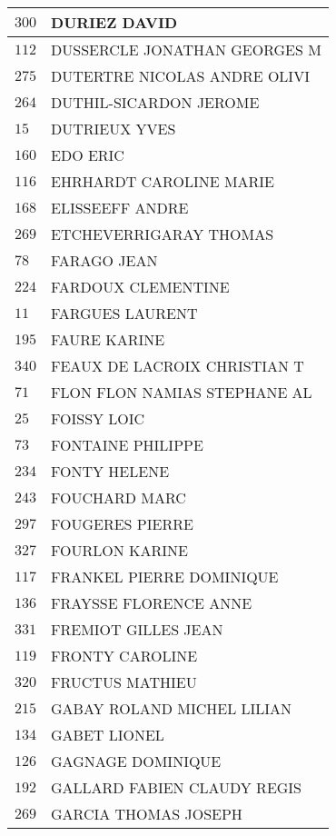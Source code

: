 \begin{xltabular}{\linewidth}{|l|X|}
    \hline
    $300$ & DURIEZ DAVID \\
    \hline
    $112$ & DUSSERCLE JONATHAN GEORGES M \\
    \hline
    $275$ & DUTERTRE NICOLAS ANDRE OLIVI \\
    \hline
    $264$ & DUTHIL-SICARDON JEROME \\
    \hline
    $15$ & DUTRIEUX YVES \\
    \hline
    $160$ & EDO ERIC \\
    \hline
    $116$ & EHRHARDT CAROLINE MARIE \\
    \hline
    $168$ & ELISSEEFF ANDRE \\
    \hline
    $269$ & ETCHEVERRIGARAY THOMAS \\
    \hline
    $78$ & FARAGO JEAN \\
    \hline
    $224$ & FARDOUX CLEMENTINE \\
    \hline
    $11$ & FARGUES LAURENT \\
    \hline
    $195$ & FAURE KARINE \\
    \hline
    $340$ & FEAUX DE LACROIX CHRISTIAN T \\
    \hline
    $71$ & FLON FLON NAMIAS STEPHANE AL \\
    \hline
    $25$ & FOISSY LOIC \\
    \hline
    $73$ & FONTAINE PHILIPPE \\
    \hline
    $234$ & FONTY HELENE \\
    \hline
    $243$ & FOUCHARD MARC \\
    \hline
    $297$ & FOUGERES PIERRE \\
    \hline
    $327$ & FOURLON KARINE \\
    \hline
    $117$ & FRANKEL PIERRE DOMINIQUE \\
    \hline
    $136$ & FRAYSSE FLORENCE ANNE \\
    \hline
    $331$ & FREMIOT GILLES JEAN \\
    \hline
    $119$ & FRONTY CAROLINE \\
    \hline
    $320$ & FRUCTUS MATHIEU \\
    \hline
    $215$ & GABAY ROLAND MICHEL LILIAN \\
    \hline
    $134$ & GABET LIONEL \\
    \hline
    $126$ & GAGNAGE DOMINIQUE \\
    \hline
    $192$ & GALLARD FABIEN CLAUDY REGIS \\
    \hline
    $269$ & GARCIA THOMAS JOSEPH \\

\end{xltabular}
